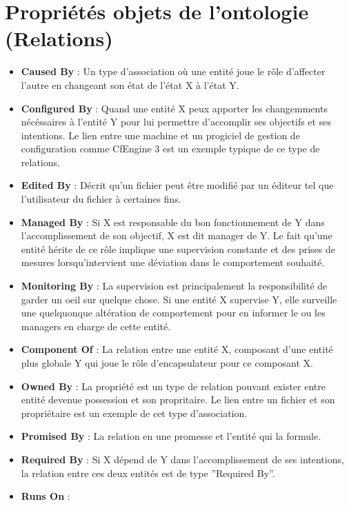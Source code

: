\section{Propriétés objets de l'ontologie (Relations)}

\begin{itemize}
  \item \textbf{Caused By} :
          Un type d'association où une entité joue le rôle d'affecter l'autre en
	  changeant son état de l'état X à l'état Y.
  \item \textbf{Configured By} : 
	  Quand une entité X peux apporter les changemments nécéssaires à
	  l'entité Y pour lui permettre d'accomplir ses objectifs et ses
	  intentions. Le lien entre une machine et un progiciel de gestion de
	  configuration comme CfEngine 3 est un exemple typique de ce type de
	  relations.
  \item \textbf{Edited By} : 
	  Décrit qu'un fichier peut être modifié par un éditeur tel que
	  l'utilisateur du fichier à certaines fins.
  \item \textbf{Managed By} : 
	  Si X est responsable du bon fonctionnement de Y dans l'accomplissement
	  de son objectif, X est dit manager de Y. Le fait qu'une entité hérite
	  de ce rôle implique une supervision constante et des prises de mesures
	  lorsqu'intervient une déviation dans le comportement souhaité.
  \item \textbf{Monitoring By} : 
	  La supervision est principalement la responsibilité de garder un oeil
	  sur quelque chose. Si une entité X supervise Y, elle surveille une
	  quelquonque altération de comportement pour en informer le ou les
	  managers en charge de cette entité.
  \item \textbf{Component Of} : 
	  La relation entre une entité X, composant d'une entité plus globale Y
	  qui joue le rôle d'encapsulateur pour ce composant X.
  \item \textbf{Owned By} : 
	  La propriété est un type de relation pouvant exister entre entité
	  devenue possession et son propritaire. Le lien entre un fichier et son
	  propriétaire est un exemple de cet type d'association.
  \item \textbf{Promised By} : 
	  La relation en une promesse et l'entité qui la formule. 
  \item \textbf{Required By} : 
	  Si X dépend de Y dans l'accomplissement de ses intentions, la relation
	  entre ces deux entités est de type ''Required By''.
  \item \textbf{Runs On} : 

\end{itemize}
